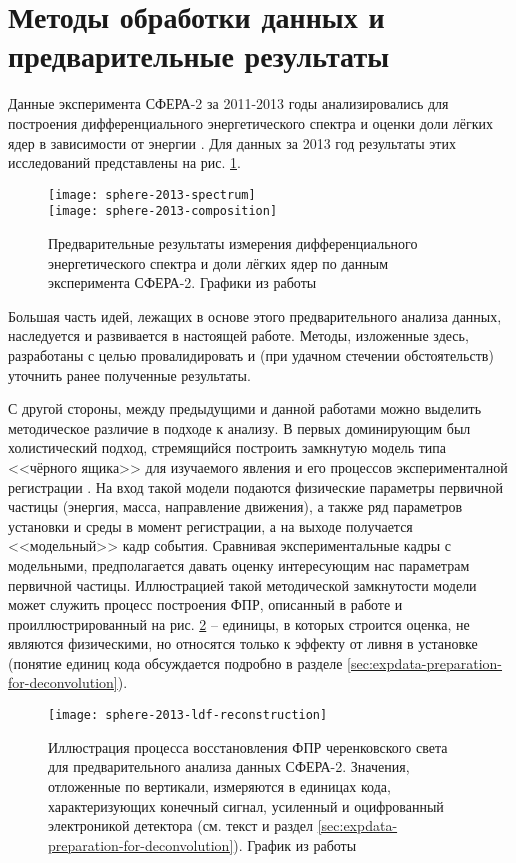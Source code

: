 \section{Методы обработки данных и предварительные результаты}

Данные эксперимента СФЕРА-2 за 2011-2013 годы анализировались для построения дифференциального энергетического спектра и оценки доли лёгких ядер в зависимости от энергии \cite{Antonov2013, Chernov2017-ICRC}. Для данных за 2013 год результаты этих исследований представлены на рис. \ref{pic:sphere-previous-results}.

\begin{figure}
	\centering
	\texttt{[image: sphere-2013-spectrum]}
	\\
	\texttt{[image: sphere-2013-composition]}
	\caption{Предварительные результаты измерения дифференциального энергетического спектра и доли лёгких ядер по данным эксперимента СФЕРА-2. Графики из работы \cite[рис. 8 и рис. 10]{Chernov2017-ICRC}}
	\label{pic:sphere-previous-results}
\end{figure}

Большая часть идей, лежащих в основе этого предварительного анализа данных, наследуется и развивается в настоящей работе. Методы, изложенные здесь, разработаны с целью провалидировать и (при удачном стечении обстоятельств) уточнить ранее полученные результаты.

С другой стороны, между предыдущими и данной работами можно выделить методическое различие в подходе к анализу. В первых доминирующим был холистический подход, стремящийся построить замкнутую модель типа <<чёрного ящика>> для изучаемого явления и его процессов эксперименталной регистрации \cite{Chernov2015}. На вход такой модели подаются физические параметры первичной частицы (энергия, масса, направление движения), а также ряд параметров установки и среды в момент регистрации, а на выходе получается <<модельный>> кадр события. Сравнивая экспериментальные кадры с модельными, предполагается давать оценку интересующим нас параметрам первичной частицы. Иллюстрацией такой методической замкнутости модели может служить процесс построения ФПР, описанный в работе \cite{Sphere2015} и проиллюстрированный на рис. \ref{pic:sphere-previous-ldf} -- единицы, в которых строится оценка, не являются физическими, но относятся только к эффекту от ливня в установке (понятие единиц кода обсуждается подробно в разделе \ref{sec:expdata-preparation-for-deconvolution}).

\begin{figure}
	\centering
	\texttt{[image: sphere-2013-ldf-reconstruction]}
	\caption{Иллюстрация процесса восстановления ФПР черенковского света для предварительного анализа данных СФЕРА-2. Значения, отложенные по вертикали, измеряются в единицах кода, характеризующих конечный сигнал, усиленный и оцифрованный электроникой детектора (см. текст и раздел \ref{sec:expdata-preparation-for-deconvolution}). График из работы \cite[рис. 27]{Sphere2015}}
	\label{pic:sphere-previous-ldf}
\end{figure}

